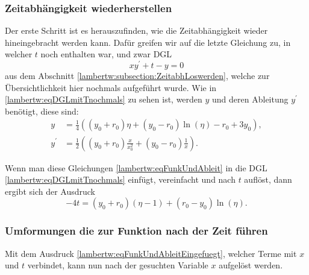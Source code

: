 \subsubsection{Zeitabhängigkeit wiederherstellen
	\label{lambertw:subsubsection:ZeitabhWiederherst}}
Der erste Schritt ist es herauszufinden, wie die Zeitabhängigkeit wieder hineingebracht werden kann. Dafür greifen wir auf die letzte Gleichung zu, in welcher \(t\) noch enthalten war, und zwar DGL 
\begin{equation}
	x y^{\prime} + t - y
	= 0
	\label{lambertw:eqDGLmitTnochmals}
\end{equation}
aus dem Abschnitt \eqref{lambertw:subsection:ZeitabhLoswerden}, welche zur Übersichtlichkeit hier nochmals aufgeführt wurde.
Wie in \eqref{lambertw:eqDGLmitTnochmals} zu sehen ist, werden \(y\) und deren Ableitung \(y^{\prime}\) benötigt, diese sind:
\begin{subequations}
	\label{lambertw:eqFunkUndAbleit}
	\begin{align}
		\label{lambertw:eqFunkUndAbleit1}
		y
		&=
		\frac{1}{4}\left(\left(y_0+r_0\right)\eta+\left(y_0-r_0\right)\operatorname{ln}\left(\eta\right)-r_0+3y_0\right), \\
		y^\prime
		&=
		\frac{1}{2}\left(\left(y_0+r_0\right)\frac{x}{x_0^2}+\left(y_0-r_0\right)\frac{1}{x}\right).
	\end{align}
\end{subequations}

Wenn man diese Gleichungen \eqref{lambertw:eqFunkUndAbleit} in die DGL \eqref{lambertw:eqDGLmitTnochmals} einfügt, vereinfacht und nach \(t\) auflöst, dann ergibt sich der Ausdruck
\begin{equation}
	-4t
	=
	\left(y_0+r_0\right)\left(\eta-1\right)+\left(r_0-y_0\right)\operatorname{ln}\left(\eta\right).
	\label{lambertw:eqFunkUndAbleitEingefuegt}
\end{equation}

\subsubsection{Umformungen die zur Funktion nach der Zeit führen
	\label{lambertw:subsubsection:UmformBisZumZiel}}
Mit dem Ausdruck \eqref{lambertw:eqFunkUndAbleitEingefuegt}, welcher Terme mit \(x\) und \(t\) verbindet, kann nun nach der gesuchten Variable \(x\) aufgelöst werden. 

